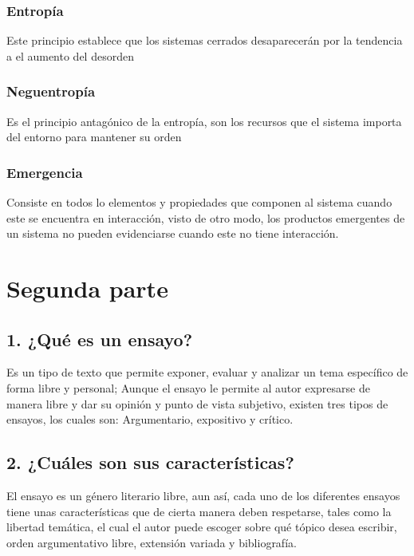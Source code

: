 \documentclass[a4paper,man,natbib]{apa6}
\begin{document}
\subsubsection{Entropía}
Este principio establece que los sistemas cerrados desaparecerán por la tendencia a el aumento del desorden \citep{10.2307/j.ctv1228hsw}

\subsubsection{Neguentropía}
Es el principio antagónico de la entropía, son los recursos que el sistema importa del entorno para mantener su orden \citep{10.2307/j.ctv1228hsw}


\subsubsection{Emergencia}
Consiste en todos lo elementos y propiedades que componen al sistema cuando este se encuentra en interacción, visto de otro modo, los productos emergentes de un sistema no pueden evidenciarse cuando este no tiene interacción. \citep{ossa}

\section{Segunda parte}
\subsection{1. ¿Qué es un ensayo?}
Es un tipo de texto que permite exponer, evaluar y analizar un tema específico de forma libre y personal; Aunque el ensayo le permite al autor expresarse de manera libre y dar su opinión y punto de vista subjetivo, existen tres tipos de ensayos, los cuales son: Argumentario, expositivo y crítico. \citep{vasquez2005preguntele}
\subsection{2. ¿Cuáles son sus características?}
El ensayo es un género literario libre, aun así, cada uno de los diferentes ensayos tiene unas características que de cierta manera deben respetarse, tales como la libertad temática, el cual el autor puede escoger sobre qué tópico desea escribir, orden argumentativo libre, extensión variada y bibliografía.
\end{document}
